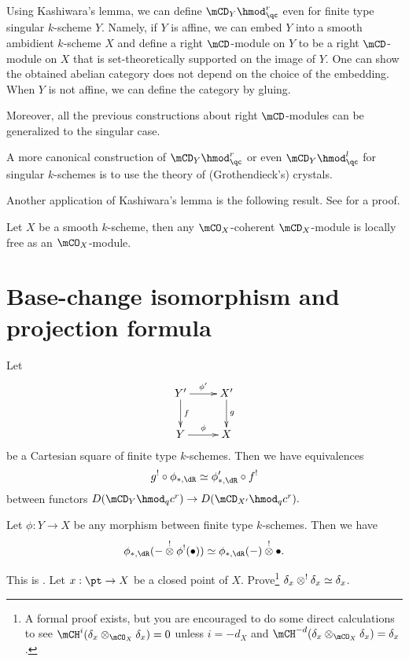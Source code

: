 	

	\begin{rem}
		Using Kashiwara's lemma, we can define $\mCD_Y\hmod_\qc^r$ even for finite type singular $k$-scheme $Y$. Namely, if $Y$ is affine, we can embed $Y$ into a smooth ambidient $k$-scheme $X$ and define a right $\mCD$-module on $Y$ to be a right $\mCD$-module on $X$ that is set-theoretically supported on the image of $Y$. One can show the obtained abelian category does not depend on the choice of the embedding. When $Y$ is not affine, we can define the category by gluing.

		Moreover, all the previous constructions about right $\mCD$-modules can be generalized to the singular case.

		A more canonical construction of $\mCD_Y\hmod_\qc^r$ or even $\mCD_Y\hmod_\qc^l$ for singular $k$-schemes is to use the theory of (Grothendieck's) crystals.
	\end{rem}

	Another application of Kashiwara's lemma is the following result. See \cite[Sect. 5.12]{G} for a proof.

	\begin{cor}
		Let $X$ be a smooth $k$-scheme, then any $\mCO_X$-coherent $\mCD_X$-module is locally free as an $\mCO_X$-module.
	\end{cor}

\section{Base-change isomorphism and projection formula}
	\begin{facts}
		Let
		\[
			\xymatrix{
				Y' \ar[r]^-{\phi'} \ar[d]^-f & X' \ar[d]^-g \\
				Y \ar[r]^-\phi & X
			}
		\]
		be a Cartesian square of finite type $k$-schemes. Then we have equivalences
		\[
			g^!\circ \phi_{*,\dR} \simeq \phi'_{*,\dR}\circ f^!
		\]
		between functors $D( \mCD_Y\hmod_qc^r ) \to D( \mCD_{X'}\hmod_qc^r ). $
	\end{facts}

	\begin{facts}
		Let $\phi: Y \to X$ be any morphism between finite type $k$-schemes. Then we have
		\[
			\phi_{*,\dR}( - \ot^! \phi^!(\bullet) ) \simeq \phi_{*,\dR}( -) \ot^! \bullet.
		\]
	\end{facts}

	\begin{exe}
		This is . Let $x:\pt \to X$ be a closed point of $X$. Prove\footnote{A formal proof exists, but you are encouraged to do some direct calculations to see $\mCH^i(\delta_x\ot_{\mCO_X} \delta_x)=0$ unless $i=-d_X$ and  $\mCH^{-d}(\delta_x\ot_{\mCO_X} \delta_x)=\delta_x$.} $\delta_x \ot^! \delta_x \simeq \delta_x$. 

	\end{exe}
	
